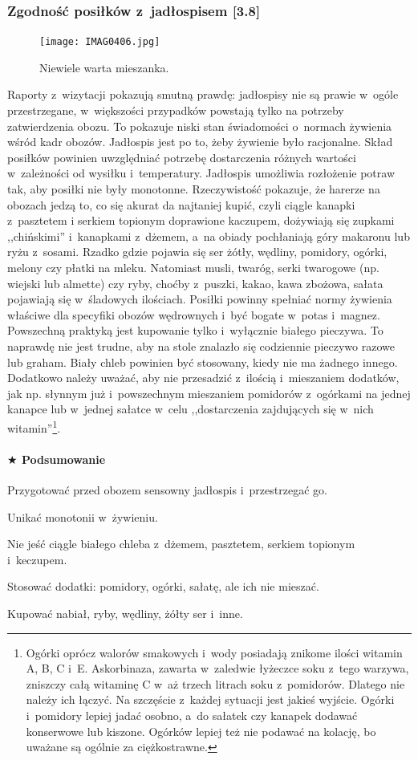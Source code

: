 \documentclass[a5paper,10pt,titlepage,twoside]{article}
\newcommand*{\thecheckbox}{\hss$\Box$} %
\newenvironment*{checklist}
{\list{}{%
\renewcommand*{\makelabel}[1]{\thecheckbox}}}
{\endlist}
\begin{document}
\subsubsection{Zgodność posiłków z~jadłospisem [3.8]}
\begin{figure}[htp]
\centering
\texttt{[image: IMAG0406.jpg]}
\caption{Niewiele warta mieszanka.}\label{fig:ogorki-z-pomidorami}
\end{figure}
Raporty z~wizytacji pokazują smutną prawdę: jadłospisy nie są prawie w~ogóle przestrzegane, w~większości przypadków powstają tylko na potrzeby zatwierdzenia obozu. To pokazuje niski stan świadomości o~normach żywienia wśród kadr obozów. Jadłospis jest po to, żeby żywienie było racjonalne. Skład posiłków powinien uwzględniać potrzebę dostarczenia różnych wartości w~zależności od wysiłku i~temperatury. Jadłospis umożliwia rozłożenie potraw tak, aby posiłki nie były monotonne. Rzeczywistość pokazuje, że harerze na obozach jedzą to, co się akurat da najtaniej kupić, czyli ciągle kanapki z~pasztetem i serkiem topionym doprawione kaczupem, dożywiają się zupkami ,,chińskimi'' i~kanapkami z~dżemem, a~na obiady pochłaniają góry makaronu lub ryżu z~sosami. Rzadko gdzie pojawia się ser żótły, wędliny, pomidory, ogórki, melony czy płatki na mleku. Natomiast musli, twaróg, serki twarogowe (np. wiejski lub almette) czy ryby, choćby z~puszki, kakao, kawa zbożowa, sałata pojawiają się w~śladowych ilościach. Posiłki powinny spełniać normy żywienia właściwe dla specyfiki obozów wędrownych i~być bogate w~potas i~magnez. Powszechną praktyką jest kupowanie tylko i~wyłącznie białego pieczywa. To naprawdę nie jest trudne, aby na stole znalazło się codziennie pieczywo razowe lub graham. Biały chleb powinien być stosowany, kiedy nie ma żadnego innego. Dodatkowo należy uważać, aby nie przesadzić z~ilością i~mieszaniem dodatków, jak np. słynnym już i~powszechnym mieszaniem pomidorów z~ogórkami na jednej kanapce lub w~jednej sałatce w~celu ,,dostarczenia zajdujących się w~nich witamin''\footnote{Ogórki oprócz walorów smakowych i~wody posiadają znikome ilości witamin A, B, C i~E. Askorbinaza, zawarta w~zaledwie łyżeczce soku z~tego warzywa, zniszczy całą witaminę C w~aż trzech litrach soku z~pomidorów. Dlatego nie należy ich łączyć. Na szczęście z~każdej sytuacji jest jakieś wyjście. Ogórki i~pomidory lepiej jadać osobno, a~do sałatek czy kanapek dodawać konserwowe lub kiszone. Ogórków lepiej też nie podawać na kolację, bo uważane są ogólnie za ciężkostrawne.}.~~\newpage
\paragraph{$\bigstar$ Podsumowanie}
\begin{checklist}
\item Przygotować przed obozem sensowny jadłospis i~przestrzegać go.
\item Unikać monotonii w~żywieniu.
\item Nie jeść ciągle białego chleba z~dżemem, pasztetem, serkiem topionym i~keczupem.
\item Stosować dodatki: pomidory, ogórki, sałatę, ale ich nie mieszać.
\item Kupować nabiał, ryby, wędliny, żółty ser i~inne.
\end{checklist}
\end{document}
